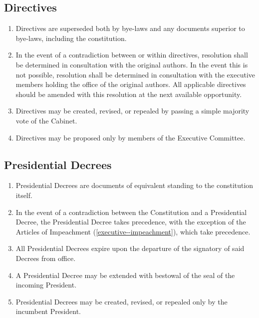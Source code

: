 \documentclass{scrartcl}
\begin{document}
        \subsection{Directives}
            \label{documentation--directive}
            \begin{enumerate}
                \item Directives are superseded both by bye-laws and any documents superior to bye-laws, including the constitution.
                \item In the event of a contradiction between or within directives, resolution shall be determined in consultation with the original authors. In the event this is not possible, resolution shall be determined in consultation with the executive members holding the office of the original authors. All applicable directives should be amended with this resolution at the next available opportunity.
                \item Directives may be created, revised, or repealed by passing a simple majority vote of the Cabinet.
                \item Directives may be proposed only by members of the Executive Committee.
            \end{enumerate}

        \subsection{Presidential Decrees}
            \label{documentation--presidential-decree}
            \begin{enumerate}
                \item Presidential Decrees are documents of equivalent standing to the constitution itself.
                \item In the event of a contradiction between the Constitution and a Presidential Decree, the Presidential Decree takes precedence, with the exception of the Articles of Impeachment (\ref{executive--impeachment}), which take precedence.
                \item All Presidential Decrees expire upon the departure of the signatory of said Decrees from office.
                \item A Presidential Decree may be extended with bestowal of the seal of the incoming President.
                \item Presidential Decrees may be created, revised, or repealed only by the incumbent President.
            \end{enumerate}
\end{document}
